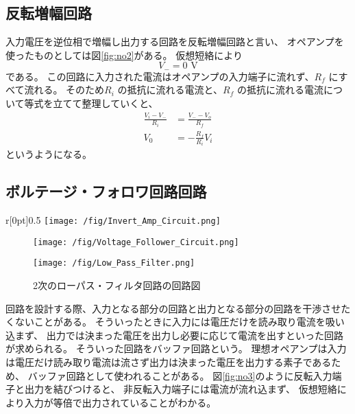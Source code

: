 \documentclass[11pt,dvipdfmx,a4paper]{jsarticle}
\begin{document}
\subsection{反転増幅回路}
入力電圧を逆位相で増幅し出力する回路を反転増幅回路と言い、
オペアンプを使ったものとしては図\ref{fig:no2}がある。
仮想短絡により
\begin{equation}
	V_{-} = 0 \text{ V}
\end{equation}
である。
この回路に入力された電流はオペアンプの入力端子に流れず、\(R_{f}\) にすべて流れる。
そのため\(R_i\) の抵抗に流れる電流と、\(R_f\) の抵抗に流れる電流について等式を立てて整理していくと、
\begin{align}
	\frac{V_i-V_{-}}{R_i} &= \frac{V_{-}-V_o}{R_f}\\
	V_0 &= -\frac{R_f}{R_i} V_i
\end{align}
というようになる。

\subsection{ボルテージ・フォロワ回路回路}
\begin{wrapfigure}{r}[0pt]{0.5\columnwidth}
	\centering
	\texttt{[image: /fig/Invert\_Amp\_Circuit.png]}
	\caption{反転増幅回路の回路図}
	\label{fig:no2}
\end{wrapfigure}
\begin{figure}[b]
	\begin{minipage}[t]{0.49\columnwidth}
		\centering
		\texttt{[image: /fig/Voltage\_Follower\_Circuit.png]}
		\caption{ボルテージ・フォロワ回路の回路図}
		\label{fig:no3}
	\end{minipage}
	\hfill
	\begin{minipage}[t]{0.49\columnwidth}
		\centering
		\texttt{[image: /fig/Low\_Pass\_Filter.png]}
		\caption{2次のローパス・フィルタ回路の回路図}
		\label{fig:no4}
	\end{minipage}
\end{figure}
回路を設計する際、入力となる部分の回路と出力となる部分の回路を干渉させたくないことがある。
そういったときに入力には電圧だけを読み取り電流を吸い込まず、
出力では決まった電圧を出力し必要に応じて電流を出すといった回路が求められる。
そういった回路をバッファ回路という。
理想オペアンプは入力は電圧だけ読み取り電流は流さず出力は決まった電圧を出力する素子であるため、
バッファ回路として使われることがある。
図\ref{fig:no3}のように反転入力端子と出力を結びつけると、
非反転入力端子には電流が流れ込まず、
仮想短絡により入力が等倍で出力されていることがわかる。
\end{document}
